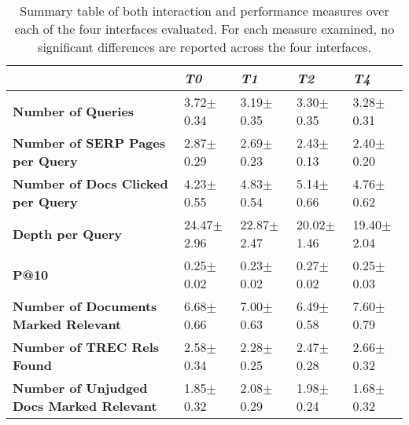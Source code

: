 
\begin{table*}[t]
    \caption{Summary table of both interaction and performance measures over each of the four interfaces evaluated. For each measure examined, no significant differences are reported across the four interfaces.\vspace{-3mm}}
    \label{tbl_actions}
    \renewcommand{\arraystretch}{1.4}
    \begin{center}
    \begin{tabulary}{\textwidth}{L{6.3cm}||D{2.4cm}|D{2.4cm}|D{2.4cm}|D{2.4cm}}
    \hline
    & \textbf{\emph{T0}} & \textbf{\emph{T1}} & \textbf{\emph{T2}} & \textbf{\emph{T4}}  \\ \hline\hline
    \textbf{Number of Queries} & 3.72$\pm$ 0.34 & 3.19$\pm$ 0.35 & 3.30$\pm$ 0.35 & 3.28$\pm$ 0.31 \\ \hline
    \textbf{Number of SERP Pages per Query} & 2.87$\pm$ 0.29 & 2.69$\pm$ 0.23 & 2.43$\pm$ 0.13 & 2.40$\pm$ 0.20 \\ \hline
    \textbf{Number of Docs Clicked per Query} & 4.23$\pm$ 0.55 & 4.83$\pm$ 0.54 & 5.14$\pm$ 0.66 & 4.76$\pm$ 0.62 \\ \hline
    \textbf{Depth per Query} & 24.47$\pm$ 2.96 & 22.87$\pm$ 2.47 & 20.02$\pm$ 1.46 & 19.40$\pm$ 2.04  \\ \hline\hline
    \textbf{P@10} & 0.25$\pm$ 0.02 & 0.23$\pm$ 0.02 & 0.27$\pm$ 0.02 & 0.25$\pm$ 0.03\\ \hline
    \textbf{Number of Documents Marked Relevant} & 6.68$\pm$ 0.66 & 7.00$\pm$ 0.63 & 6.49$\pm$ 0.58 & 7.60$\pm$ 0.79 \\ \hline
    \textbf{Number of TREC Rels Found} & 2.58$\pm$ 0.34 & 2.28$\pm$ 0.25 & 2.47$\pm$ 0.28 & 2.66$\pm$ 0.32 \\ \hline
	\textbf{Number of Unjudged Docs Marked Relevant} & 1.85$\pm$ 0.32 & 2.08$\pm$ 0.29 & 1.98$\pm$ 0.24 & 1.68$\pm$ 0.32 \\ \hline
	

    \end{tabulary}
    \end{center}
    \vspace{-2mm}
\end{table*}

